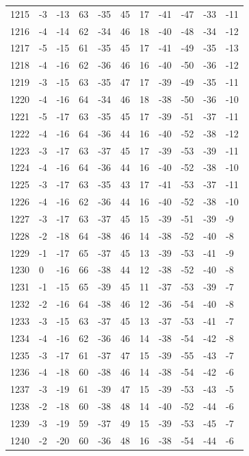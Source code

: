 \begin{table}[H]
\begin{tabular}{lllllllllll}
1215 & -3 & -13 & 63 & -35 & 45 & 17 & -41 & -47 & -33 & -11 \\
1216 & -4 & -14 & 62 & -34 & 46 & 18 & -40 & -48 & -34 & -12 \\
1217 & -5 & -15 & 61 & -35 & 45 & 17 & -41 & -49 & -35 & -13 \\
1218 & -4 & -16 & 62 & -36 & 46 & 16 & -40 & -50 & -36 & -12 \\
1219 & -3 & -15 & 63 & -35 & 47 & 17 & -39 & -49 & -35 & -11 \\
1220 & -4 & -16 & 64 & -34 & 46 & 18 & -38 & -50 & -36 & -10 \\
1221 & -5 & -17 & 63 & -35 & 45 & 17 & -39 & -51 & -37 & -11 \\
1222 & -4 & -16 & 64 & -36 & 44 & 16 & -40 & -52 & -38 & -12 \\
1223 & -3 & -17 & 63 & -37 & 45 & 17 & -39 & -53 & -39 & -11 \\
1224 & -4 & -16 & 64 & -36 & 44 & 16 & -40 & -52 & -38 & -10 \\
1225 & -3 & -17 & 63 & -35 & 43 & 17 & -41 & -53 & -37 & -11 \\
1226 & -4 & -16 & 62 & -36 & 44 & 16 & -40 & -52 & -38 & -10 \\
1227 & -3 & -17 & 63 & -37 & 45 & 15 & -39 & -51 & -39 & -9 \\
1228 & -2 & -18 & 64 & -38 & 46 & 14 & -38 & -52 & -40 & -8 \\
1229 & -1 & -17 & 65 & -37 & 45 & 13 & -39 & -53 & -41 & -9 \\
1230 & 0 & -16 & 66 & -38 & 44 & 12 & -38 & -52 & -40 & -8 \\
1231 & -1 & -15 & 65 & -39 & 45 & 11 & -37 & -53 & -39 & -7 \\
1232 & -2 & -16 & 64 & -38 & 46 & 12 & -36 & -54 & -40 & -8 \\
1233 & -3 & -15 & 63 & -37 & 45 & 13 & -37 & -53 & -41 & -7 \\
1234 & -4 & -16 & 62 & -36 & 46 & 14 & -38 & -54 & -42 & -8 \\
1235 & -3 & -17 & 61 & -37 & 47 & 15 & -39 & -55 & -43 & -7 \\
1236 & -4 & -18 & 60 & -38 & 46 & 14 & -38 & -54 & -42 & -6 \\
1237 & -3 & -19 & 61 & -39 & 47 & 15 & -39 & -53 & -43 & -5 \\
1238 & -2 & -18 & 60 & -38 & 48 & 14 & -40 & -52 & -44 & -6 \\
1239 & -3 & -19 & 59 & -37 & 49 & 15 & -39 & -53 & -45 & -7 \\
1240 & -2 & -20 & 60 & -36 & 48 & 16 & -38 & -54 & -44 & -6 \\

\end{tabular}
\end{table}
